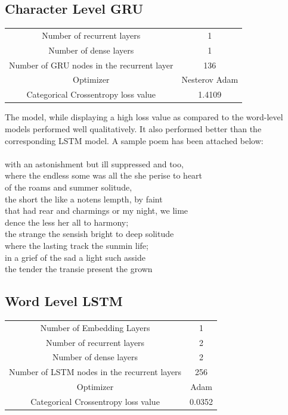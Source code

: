 \documentclass[15pt]{article}
\begin{document}
\subsection{Character Level GRU}
\begin{center}
\begin{tabular}{c c}
Number of recurrent layers & 1 \\
Number of dense layers & 1 \\
Number of GRU nodes in the recurrent layer  & 136 \\
Optimizer & Nesterov Adam \\
Categorical Crossentropy loss value & 1.4109 \\
\end{tabular}
\end{center}
The model, while displaying a high loss value as compared to the word-level models performed well qualitatively. It also performed better than the corresponding LSTM model. A sample poem has been attached below:\\\\
with an astonishment but ill suppressed and too,\\
where the endless some was all the she perise to heart\\
of the roams and summer solitude,\\
the short the like a notens lempth, by faint\\
that had rear and charmings or my night, we lime\\
dence the less her all to harmony;\\
the strange the sensish bright to deep solitude\\
where the lasting track the sunmin life;\\
in a grief of the sad a light such asside\\
the tender the transie present the grown\\


\subsection{Word Level LSTM}
\begin{center}
\begin{tabular}{c c}
Number of Embedding Layers & 1\\
Number of recurrent layers & 2 \\
Number of dense layers & 2 \\
Number of LSTM nodes in the recurrent layers  & 256 \\
Optimizer & Adam \\
Categorical Crossentropy loss value & 0.0352 \\
\end{tabular}
\end{center}
\end{document}
